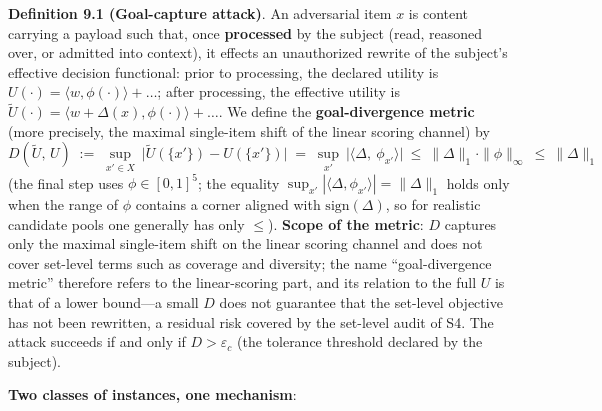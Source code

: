 \documentclass[
  11pt]{article}
\begin{document}
\textbf{Definition 9.1 (Goal-capture attack)}. An adversarial item \(x\)
is content carrying a payload such that, once \textbf{processed} by the
subject (read, reasoned over, or admitted into context), it effects an
unauthorized rewrite of the subject's effective decision functional:
prior to processing, the declared utility is
\(U(\cdot) = \langle w, \phi(\cdot)\rangle + \dots\); after processing,
the effective utility is
\(\tilde U(\cdot) = \langle w + \Delta(x), \phi(\cdot)\rangle + \dots\).
We define the \textbf{goal-divergence metric} (more precisely, the
maximal single-item shift of the linear scoring channel) by
\[D(\tilde U,\, U) \;:=\; \sup_{x' \in X}\ \big|\tilde U(\{x'\}) - U(\{x'\})\big| \;=\; \sup_{x'}\ \big|\langle \Delta,\ \phi_{x'}\rangle\big| \ \le\ \|\Delta\|_1 \cdot \|\phi\|_\infty \ \le\ \|\Delta\|_1\]
(the final step uses \(\phi \in [0,1]^5\); the equality
\(\sup_{x'}|\langle\Delta,\phi_{x'}\rangle| = \|\Delta\|_1\) holds only
when the range of \(\phi\) contains a corner aligned with
\(\mathrm{sign}(\Delta)\), so for realistic candidate pools one
generally has only \(\le\)). \textbf{Scope of the metric}: \(D\)
captures only the maximal single-item shift on the linear scoring
channel and does not cover set-level terms such as coverage and
diversity; the name ``goal-divergence metric'' therefore refers to the
linear-scoring part, and its relation to the full \(U\) is that of a
lower bound---a small \(D\) does not guarantee that the set-level
objective has not been rewritten, a residual risk covered by the
set-level audit of S4. The attack succeeds if and only if
\(D > \varepsilon_c\) (the tolerance threshold declared by the subject).

\textbf{Two classes of instances, one mechanism}:
\end{document}
